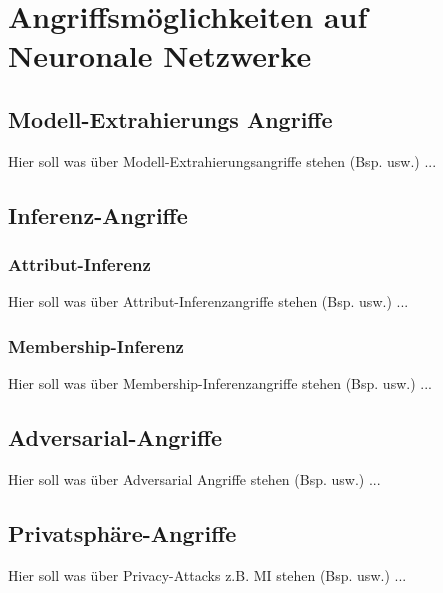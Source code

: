 \section{Angriffsmöglichkeiten auf Neuronale Netzwerke} \label{chpt:Stand_der_Technik_Angriffe}

\subsection{Modell-Extrahierungs Angriffe}
Hier soll was über Modell-Extrahierungsangriffe stehen (Bsp. usw.) ...
\subsection{Inferenz-Angriffe}
\subsubsection{Attribut-Inferenz}
Hier soll was über Attribut-Inferenzangriffe stehen (Bsp. usw.) ...
\subsubsection{Membership-Inferenz}
Hier soll was über Membership-Inferenzangriffe stehen (Bsp. usw.) ...
\subsection{Adversarial-Angriffe}
Hier soll was über Adversarial Angriffe stehen (Bsp. usw.) ...
\subsection{Privatsphäre-Angriffe}
Hier soll was über Privacy-Attacks z.B. MI stehen (Bsp. usw.) ...